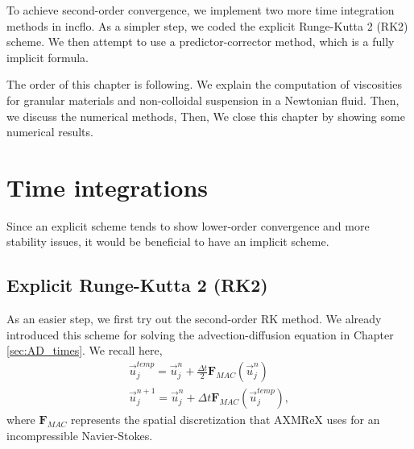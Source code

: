 To achieve second-order convergence, we implement two more time integration methods in incflo. As a simpler step, we coded the explicit Runge-Kutta 2 (RK2) scheme. We then attempt to use a predictor-corrector method, which is a fully implicit formula.
\par
The order of this chapter is following. We explain the computation of viscosities for granular materials and non-colloidal suspension in a Newtonian fluid. Then, we discuss the numerical methods,   Then,  We close this chapter by showing some numerical results.
\section{Time integrations}
Since an explicit scheme tends to show lower-order convergence and more stability issues, it would be beneficial to have an implicit scheme.  
\subsection{Explicit Runge-Kutta 2 (RK2)}
As an easier step, we first try out the second-order RK method. We already introduced this scheme for solving the advection-diffusion equation in Chapter \ref{sec:AD_times}. We recall here, 
\begin{align}
	\vec{u}_{j}^{temp} = \vec{u}_j^{n} + \frac{\Delta t}{2} {\bm F_{MAC}} \left( \vec{u}_j^{n} \right)
	\label{eq_RK2_s1} \\ 
	\vec{u}_j^{n+1} = \vec{u}_j^{n} + \Delta t {\bm F_{MAC}} \left( \vec{u}_j^{temp} \right),
	\label{eq_RK2_s2}
\end{align}
where ${\bm F_{MAC}}$ represents the spatial discretization that AXMReX uses for an incompressible Navier-Stokes. 


